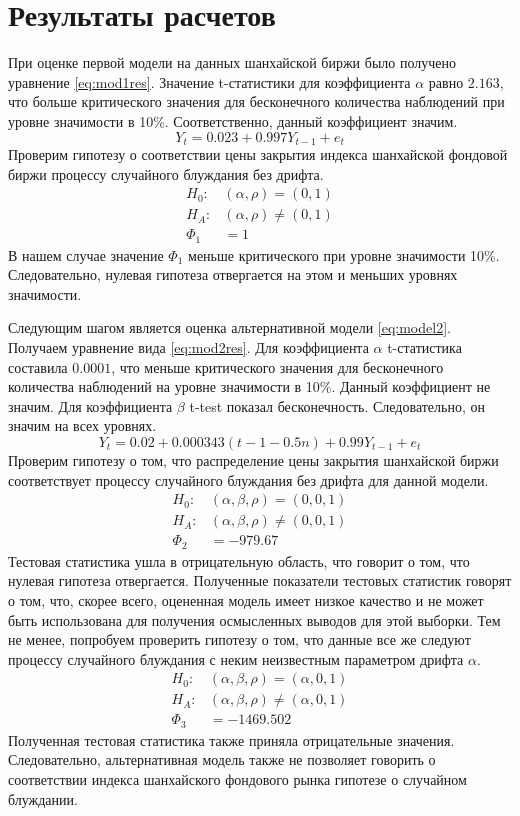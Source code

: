 \documentclass[a4paper,12pt]{article}
\begin{document}
\section{Результаты расчетов}
При оценке первой модели на данных шанхайской биржи было получено уравнение \ref{eq:mod1res}. Значение t-статистики для коэффициента $\alpha$ равно $2.163$, что больше критического значения для бесконечного количества наблюдений при уровне значимости в 10\%. Соответственно, данный коэффициент значим.
  \begin{equation}
    \label{eq:mod1res}
    Y_t=0.023+0.997Y_{t-1}+e_t
  \end{equation}
Проверим гипотезу о соответствии цены закрытия индекса шанхайской фондовой биржи процессу случайного блуждания без дрифта.
\begin{align}
  H_0:&(\alpha,\rho)=(0,1)\\
  H_A:&(\alpha,\rho)\neq(0,1)\\
  \Phi_1&=1
\end{align}
В нашем случае значение $\Phi_1$ меньше критического при уровне значимости 10\%. Следовательно, нулевая гипотеза отвергается на этом и меньших уровнях значимости.

Следующим шагом является оценка альтернативной модели \ref{eq:model2}. Получаем уравнение вида \ref{eq:mod2res}. Для коэффициента $\alpha$ t-статистика составила $0.0001$, что меньше критического значения для бесконечного количества наблюдений на уровне значимости в 10\%. Данный коэффициент не значим. Для коэффициента $\beta$ t-test показал бесконечность. Следовательно, он значим на всех уровнях.
\begin{equation}
  \label{eq:mod2res}
  Y_t=0.02+0.000343(t-1-0.5n)+0.99Y_{t-1}+e_t
\end{equation}
Проверим гипотезу о том, что распределение цены закрытия шанхайской биржи соответствует процессу случайного блуждания без дрифта для данной модели.
\begin{align}
  H_0:&(\alpha, \beta, \rho)=(0,0,1)\\
  H_A:&(\alpha,\beta, \rho)\neq(0,0,1)\\
  \Phi_2&=-979.67
\end{align}
Тестовая статистика ушла в отрицательную область, что говорит о том, что нулевая гипотеза отвергается. Полученные показатели тестовых статистик говорят о том, что, скорее всего, оцененная модель имеет низкое качество и не может быть использована для получения осмысленных выводов для этой выборки. Тем не менее, попробуем проверить гипотезу о том, что данные все же следуют процессу случайного блуждания с неким неизвестным параметром дрифта $\alpha$.
\begin{align}
  H_0:&(\alpha, \beta, \rho)=(\alpha,0,1)\\
  H_A:&(\alpha,\beta, \rho)\neq(\alpha,0,1)\\
  \Phi_3&=-1469.502
\end{align}
Полученная тестовая статистика также приняла отрицательные значения. Следовательно, альтернативная модель также не позволяет говорить о соответствии индекса шанхайского фондового рынка гипотезе о случайном блуждании.
\end{document}
